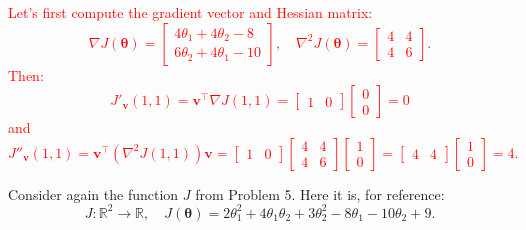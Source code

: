 \documentclass[12pt,reqno]{amsart}
\begin{document}
\bigskip
\textcolor{red}{Let's first compute the gradient vector and Hessian matrix:
	\[\nabla J(\boldsymbol{\theta}) = \begin{bmatrix}
	4\theta_1 + 4\theta_2 -8 \\
	6\theta_2 + 4\theta_1-10
	\end{bmatrix}, \quad
	\nabla^2 J(\boldsymbol{\theta}) = \begin{bmatrix}
	4 & 4 \\
	4 & 6
	\end{bmatrix}.
	\]
Then:
	\[J'_\mathbf{v}(1,1) = \mathbf{v}^\intercal \nabla J(1,1) =  \begin{bmatrix} 1 & 0 \end{bmatrix} \begin{bmatrix} 0 \\ 0 \end{bmatrix} = 0
	\]
and
	\[J''_\mathbf{v}(1,1) = \mathbf{v}^\intercal \left(\nabla^2 J(1,1) \right) \mathbf{v} = \begin{bmatrix} 1 & 0 \end{bmatrix} \begin{bmatrix}
	4 & 4 \\
	4 & 6
	\end{bmatrix} \begin{bmatrix} 1 \\ 0 \end{bmatrix} = \begin{bmatrix} 4 & 4 \end{bmatrix} \begin{bmatrix} 1 \\ 0 \end{bmatrix} = 4.
	\]}
\bigskip







\prob Consider again the function $J$ from Problem 5. Here it is, for reference:
	\[J: \mathbb{R}^2 \to \mathbb{R}, \quad J(\boldsymbol{\theta}) = 2\theta_1^2 + 4\theta_1\theta_2 + 3\theta_2^2 -8\theta_1 - 10\theta_2 + 9.
	\]
\end{document}
